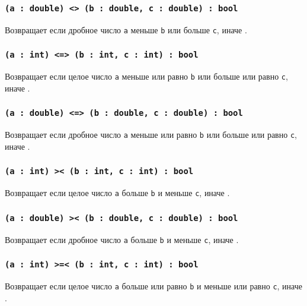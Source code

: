 \subsubsection{\texttt{(a : double) <> (b : double, c : double) : bool}}

Возвращает \true{} если дробное число \texttt{a} меньше \texttt{b} или больше \texttt{c}, иначе \false{}.

\subsubsection{\texttt{(a : int) <=> (b : int, c : int) : bool}}

Возвращает \true{} если целое число \texttt{a} меньше или равно \texttt{b} или больше или равно \texttt{c}, иначе \false{}.

\subsubsection{\texttt{(a : double) <=> (b : double, c : double) : bool}}

Возвращает \true{} если дробное число \texttt{a} меньше или равно \texttt{b} или больше или равно \texttt{c}, иначе \false{}.

\subsubsection{\texttt{(a : int) >< (b : int, c : int) : bool}}

Возвращает \true{} если целое число \texttt{a} больше \texttt{b} и меньше \texttt{c}, иначе \false{}.

\subsubsection{\texttt{(a : double) >< (b : double, c : double) : bool}}

Возвращает \true{} если дробное число \texttt{a} больше \texttt{b} и меньше \texttt{c}, иначе \false{}.

\subsubsection{\texttt{(a : int) >=< (b : int, c : int) : bool}}

Возвращает \true{} если целое число \texttt{a} больше или равно \texttt{b} и меньше или равно \texttt{c}, иначе \false{}.

